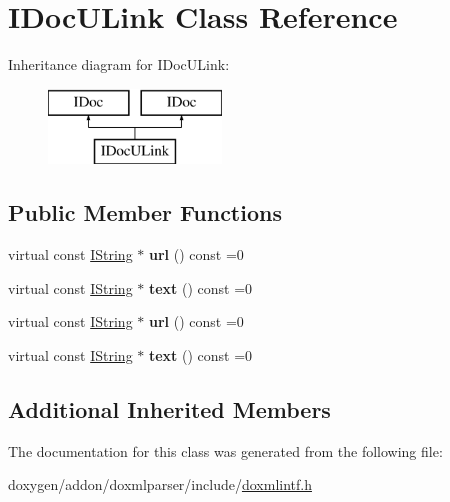 \hypertarget{class_i_doc_u_link}{}\section{I\+Doc\+U\+Link Class Reference}
\label{class_i_doc_u_link}
Inheritance diagram for I\+Doc\+U\+Link\+:\begin{figure}[H]
\begin{center}
\leavevmode
\includegraphics[height=2.000000cm]{class_i_doc_u_link}
\end{center}
\end{figure}
\subsection*{Public Member Functions}
\begin{DoxyCompactItemize}
\item 
\mbox{\label{class_i_doc_u_link_a00850c38b48035a49307e69072d53afc}} 
virtual const \mbox{\hyperlink{class_i_string}{I\+String}} $\ast$ {\bfseries url} () const =0
\item 
\mbox{\label{class_i_doc_u_link_a30ec5289ee3c7bacca3348e20de3a079}} 
virtual const \mbox{\hyperlink{class_i_string}{I\+String}} $\ast$ {\bfseries text} () const =0
\item 
\mbox{\label{class_i_doc_u_link_a00850c38b48035a49307e69072d53afc}} 
virtual const \mbox{\hyperlink{class_i_string}{I\+String}} $\ast$ {\bfseries url} () const =0
\item 
\mbox{\label{class_i_doc_u_link_a30ec5289ee3c7bacca3348e20de3a079}} 
virtual const \mbox{\hyperlink{class_i_string}{I\+String}} $\ast$ {\bfseries text} () const =0
\end{DoxyCompactItemize}
\subsection*{Additional Inherited Members}


The documentation for this class was generated from the following file\+:\begin{DoxyCompactItemize}
\item 
doxygen/addon/doxmlparser/include/\mbox{\hyperlink{include_2doxmlintf_8h}{doxmlintf.\+h}}\end{DoxyCompactItemize}
